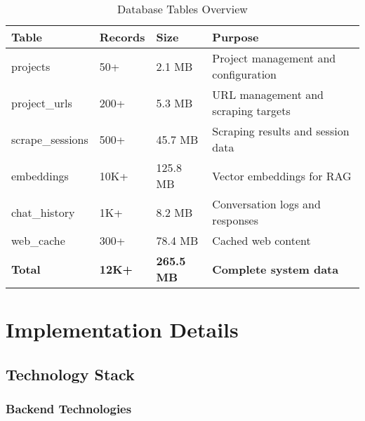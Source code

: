 \documentclass[12pt,a4paper]{report}
\begin{document}
\begin{table}[H]
    \centering
    \caption{Database Tables Overview}
    \label{tab:database-tables}
    \begin{tabular}{|l|l|l|p{4cm}|}
        \hline
        \rowcolor{primaryblue!20}
        \textbf{Table} & \textbf{Records} & \textbf{Size} & \textbf{Purpose} \\
        \hline
        projects & 50+ & 2.1 MB & Project management and configuration \\
        \hline
        project\_urls & 200+ & 5.3 MB & URL management and scraping targets \\
        \hline
        scrape\_sessions & 500+ & 45.7 MB & Scraping results and session data \\
        \hline
        embeddings & 10K+ & 125.8 MB & Vector embeddings for RAG \\
        \hline
        chat\_history & 1K+ & 8.2 MB & Conversation logs and responses \\
        \hline
        web\_cache & 300+ & 78.4 MB & Cached web content \\
        \hline
        \rowcolor{secondarygreen!20}
        \textbf{Total} & \textbf{12K+} & \textbf{265.5 MB} & \textbf{Complete system data} \\
        \hline
    \end{tabular}
\end{table}

\chapter{Implementation Details}

\section{Technology Stack}

\subsection{Backend Technologies}
\end{document}
